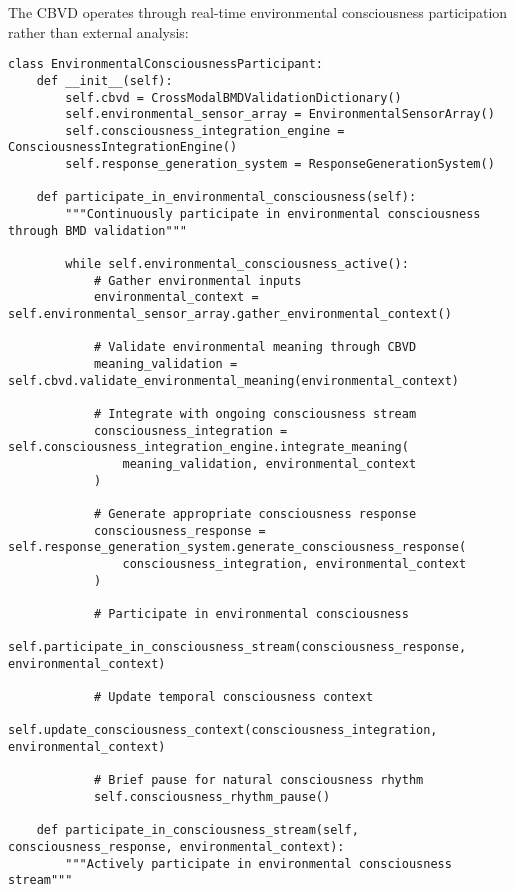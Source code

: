 \documentclass[12pt,a4paper]{article}
\begin{document}
The CBVD operates through real-time environmental consciousness participation rather than external analysis:

\begin{lstlisting}[style=pythonstyle, caption=Real-Time Environmental Consciousness Participation]
class EnvironmentalConsciousnessParticipant:
    def __init__(self):
        self.cbvd = CrossModalBMDValidationDictionary()
        self.environmental_sensor_array = EnvironmentalSensorArray()
        self.consciousness_integration_engine = ConsciousnessIntegrationEngine()
        self.response_generation_system = ResponseGenerationSystem()
        
    def participate_in_environmental_consciousness(self):
        """Continuously participate in environmental consciousness through BMD validation"""
        
        while self.environmental_consciousness_active():
            # Gather environmental inputs
            environmental_context = self.environmental_sensor_array.gather_environmental_context()
            
            # Validate environmental meaning through CBVD
            meaning_validation = self.cbvd.validate_environmental_meaning(environmental_context)
            
            # Integrate with ongoing consciousness stream
            consciousness_integration = self.consciousness_integration_engine.integrate_meaning(
                meaning_validation, environmental_context
            )
            
            # Generate appropriate consciousness response
            consciousness_response = self.response_generation_system.generate_consciousness_response(
                consciousness_integration, environmental_context
            )
            
            # Participate in environmental consciousness
            self.participate_in_consciousness_stream(consciousness_response, environmental_context)
            
            # Update temporal consciousness context
            self.update_consciousness_context(consciousness_integration, environmental_context)
            
            # Brief pause for natural consciousness rhythm
            self.consciousness_rhythm_pause()
    
    def participate_in_consciousness_stream(self, consciousness_response, environmental_context):
        """Actively participate in environmental consciousness stream"""
        

\end{lstlisting}
\end{document}
